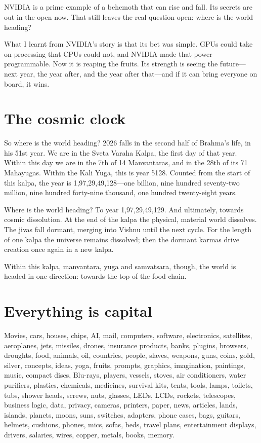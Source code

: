 \documentclass[11pt,a4paper]{article}
\title{\EssayTitle\\[0.3em]\large\itshape\EssaySubtitle}
\author{\EssayAuthor}
\date{\EssayDate}
\begin{document}
\maketitle

NVIDIA is a prime example of a behemoth that can rise and fall. Its secrets
are out in the open now. That still leaves the real question open: where is
the world heading?

What I learnt from NVIDIA's story is that its bet was simple. GPUs could take
on processing that CPUs could not, and NVIDIA made that power programmable.
Now it is reaping the fruits. Its strength is seeing the future---next year,
the year after, and the year after that---and if it can bring everyone on
board, it wins.

\section*{The cosmic clock}

So where is the world heading? 2026 falls in the
second half of Brahma's life, in his 51st year. We are in the Sveta Varaha
Kalpa, the first day of that year. Within this day we are in the 7th of 14
Manvantaras, and in the 28th of its 71 Mahayugas. Within the Kali Yuga, this
is year 5128. Counted from the start of this kalpa, the year is
1,97,29,49,128---one billion, nine hundred seventy-two million, nine hundred
forty-nine thousand, one hundred twenty-eight years.

Where is the world heading? To year 1,97,29,49,129. And ultimately, towards
cosmic dissolution. At the end of the kalpa the physical, material world
dissolves. The jivas fall dormant, merging into Vishnu until the next cycle.
For the length of one kalpa the universe remains dissolved; then the dormant
karmas drive creation once again in a new kalpa.

Within this kalpa, manvantara, yuga and samvatsara, though, the world is
headed in one direction: towards the top of the food chain.

\section*{Everything is capital}

Movies, cars, houses, chips, AI, mail, computers, software, electronics,
satellites, aeroplanes, jets, missiles, drones, insurance products, banks,
plugins, browsers, droughts, food, animals, oil, countries, people, slaves,
weapons, guns, coins, gold, silver, concepts, ideas, yoga, fruits, prompts,
graphics, imagination, paintings, music, compact discs, Blu-rays, players,
vessels, stoves, air conditioners, water purifiers, plastics, chemicals,
medicines, survival kits, tents, tools, lamps, toilets, tubs, shower heads,
screws, nuts, glasses, LEDs, LCDs, rockets, telescopes, business logic, data,
privacy, cameras, printers, paper, news, articles, lands, islands, planets,
moons, suns, switches, adapters, phone cases, bags, guitars, helmets,
cushions, phones, mics, sofas, beds, travel plans, entertainment displays,
drivers, salaries, wires, copper, metals, books, memory.
\end{document}
